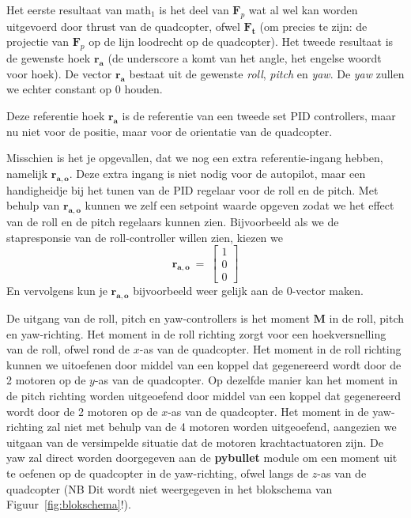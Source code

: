 \documentclass[a4paper,11pt]{article}
\begin{document}
  Het eerste resultaat van math$_1$ is het deel van $\mathbf{F}_p$ wat al wel kan
  worden uitgevoerd door thrust van de quadcopter, ofwel $\mathbf{F_t}$ (om
  precies te zijn: de projectie van $\mathbf{F}_p$ op de lijn loodrecht op de
  quadcopter). Het tweede resultaat is de gewenste hoek $\mathbf{r_a}$ (de
  underscore a komt van het angle, het engelse woordt voor hoek). De vector
  $\mathbf{r_a}$ bestaat uit de gewenste \emph{roll}, \emph{pitch} en
  \emph{yaw}. De \emph{yaw} zullen we echter constant op 0 houden.

  Deze referentie hoek $\mathbf{r_a}$ is de referentie van een tweede set PID
  controllers, maar nu niet voor de positie, maar voor de orientatie van de
  quadcopter.

  Misschien is het je opgevallen, dat we nog een extra referentie-ingang
  hebben, namelijk $\mathbf{r_{a,o}}$. Deze extra ingang is niet nodig voor de
  autopilot, maar een handigheidje bij het tunen van de PID regelaar voor de
 roll en de pitch. Met behulp van $\mathbf{r_{a,o}}$ kunnen we zelf een
  setpoint waarde opgeven zodat we het effect van de roll en de pitch
  regelaars kunnen zien. Bijvoorbeeld als we de stapresponsie van de
  roll-controller willen zien, kiezen we 
  \[
  \mathbf{r_{a,o}} ~= ~ \left[\begin{array}{c}1\\0 \\0 \end{array}\right]
  \]
  En vervolgens kun je $\mathbf{r_{a,o}}$ bijvoorbeeld weer gelijk aan de 0-vector maken.

  De uitgang van de roll, pitch en yaw-controllers is het moment $\mathbf{M}$
  in de roll, pitch en yaw-richting. Het moment in de roll richting zorgt voor
  een hoekversnelling van de roll, ofwel rond de $x$-as van de quadcopter. Het
  moment in de roll richting kunnen we uitoefenen door middel van een koppel
  dat gegenereerd wordt door de 2 motoren op de $y$-as van de quadcopter. Op
  dezelfde manier kan het moment in de pitch richting worden uitgeoefend door
  middel van een koppel dat gegenereerd wordt door de 2 motoren op de $x$-as
  van de quadcopter. Het moment in de yaw-richting zal niet met behulp van de
  4 motoren worden uitgeoefend, aangezien we uitgaan van de versimpelde
    situatie dat de motoren krachtactuatoren zijn. De yaw zal direct worden
    doorgegeven aan de \textbf{pybullet} module om een moment uit te oefenen
    op de quadcopter in de yaw-richting, ofwel langs de $z$-as van de
    quadcopter (NB Dit wordt niet weergegeven in het blokschema van
    Figuur~\ref{fig:blokschema}!).
\end{document}
